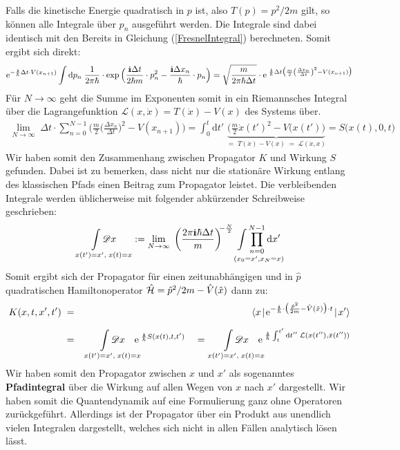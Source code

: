 Falls die kinetische Energie quadratisch in $p$ ist, also $T(p) = p^2/2m$ gilt, so können alle Integrale über $p_n$ ausgeführt werden. Die Integrale sind dabei identisch mit den Bereits in Gleichung (\ref{FresnelIntegral}) berechneten. Somit ergibt sich direkt: 
\begin{eqnarray*}
	\e^{-\frac{\I}{\hbar}\Delta t\cdot V(x_{n+1})}\int\mathrm{d}p_n\;\frac{1}{2\pi\hbar}\cdot\exp\Big(\frac{\I\Delta t}{2\hbar m}\cdot p_n^2-\frac{\I\Delta x_n}{\hbar}\cdot p_n\Big)=\sqrt{\frac{m}{2\pi\hbar\Delta t}}\cdot \e^{\;\frac{\I}{\hbar}\Delta t\big(\frac{m}{2} \left(\frac{\Delta x_n}{\Delta t}\right)^2-V(x_{n+1})\big)}
\end{eqnarray*} 
Für $N\to\infty$ geht die Summe im Exponenten somit in ein Riemannsches Integral über die Lagrangefunktion $\mathcal{L}(x,\dot{x})=T(\dot{x})-V(x)$ des Systems über. 
\begin{eqnarray*}
	\lim_{N\to\infty}\; \Delta t \cdot \sum_{n=0}^{N-1}\bigg(\frac{m}{2}\Big(\frac{\Delta x_n}{\Delta t}\Big)^2 - V(x_{n+1})\bigg) = \int_0^{t}\mathrm{d}t'\;\underbrace{\Big(\frac{m}{2}\dot{x}(t')^2-V(x(t')\Big)}_{=\;T(\dot{x})-V(x) \;=\; \mathcal{L}(\dot{x},x)} = S\big(x(t),0,t\big)
\end{eqnarray*}
Wir haben somit den Zusammenhang zwischen Propagator $K$ und Wirkung $S$ gefunden. Dabei ist zu bemerken, dass nicht nur die stationäre Wirkung entlang des klassischen Pfads einen Beitrag zum Propagator leistet. Die verbleibenden Integrale werden üblicherweise mit folgender abkürzender Schreibweise geschrieben: 
\begin{eqnarray*}  
	\underset{x(t') = x',\;x(t) = x}{\int \mathscr{D} x} := \lim_{N\to\infty}\;\bigg(\frac{2\pi\I\hbar\Delta t}{m}\bigg)^{\!\!-\frac{N}{2}} \underset{(x_0=x',x_N=x)}{\int\prod_{n=0}^{N-1}\mathrm{d}x'}
\end{eqnarray*}
Somit ergibt sich der Propagator für einen zeitunabhängigen und in $\hat{p}$ quadratischen Hamiltonoperator $\hat{\mathcal H}=\hat{p}^2/2m-\hat{V}(\hat{x})$ dann zu: 
\begin{eqnarray}
	K(x,t,x',t') \;&=&\; \underset{\;}{\bracket{x}{\e^{-\frac{\I}{\hbar}\cdot\big(\frac{\hat{p}^2}{2m}-\hat{V}(\hat{x})\big)\cdot t}}{x'}} \nonumber 
	\\
	&=& \underset{x(t')=x',\;x(t)=x}{\int\mathscr{D}x} \!\!\!\! \e^{\;\frac{\I}{\hbar} S(x(t),t,t')} \quad= \underset{x(t')=x',\;x(t)=x}{\int\mathscr{D}x} \!\!\!\! \e^{\;\frac{\I}{\hbar} \int_t^{t'}\mathrm{d}t''\;\mathcal{L}(x(t''),\dot{x}(t''))} \label{Pfadintegral}
\end{eqnarray}
Wir haben somit den Propagator zwischen $x$ und $x'$ als sogenanntes {\bf Pfadintegral} über die Wirkung auf allen Wegen von $x$ nach $x'$ dargestellt. Wir haben somit die Quantendynamik auf eine Formulierung ganz ohne Operatoren zurückgeführt. Allerdings ist der Propagator über ein Produkt aus unendlich vielen Integralen dargestellt, welches sich nicht in allen Fällen analytisch lösen lässt. 


